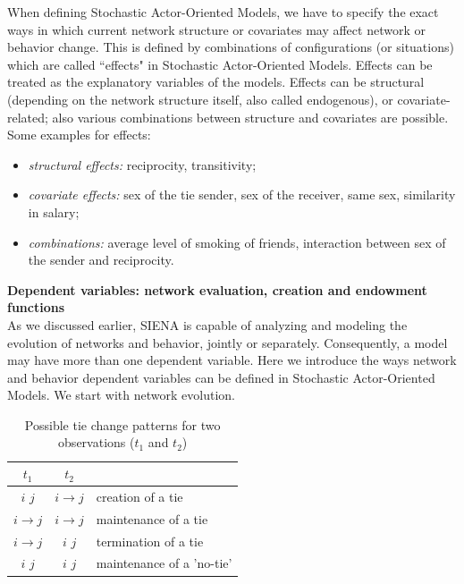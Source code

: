 \documentclass[a4paper,fleqn,11pt]{article}
\newcommand{\+}{\, + \,}
\newcommand{\SI}{{\sf SIENA }}
\newcommand{\saom}{{Stochastic Actor-Oriented Model}}
\begin{document}
When defining {\saom}s, we have to specify
the exact ways in which current network structure or covariates may affect
network or behavior change. This is defined
by combinations of configurations (or situations) which
are called ``effects" in {\saom}s.
Effects can be treated as the explanatory variables of the models.
Effects can be structural (depending on the network structure itself,
also called endogenous), or covariate-related; also various combinations
between structure and covariates are possible. Some examples for effects:
\begin{itemize}
	\item \emph{structural effects:} reciprocity, transitivity;
	\item \emph{covariate effects:} sex of the tie sender, sex of the receiver,
                same sex, similarity in salary;
	\item \emph{combinations:} average level of smoking of friends,
                interaction between sex of the sender and reciprocity.\\
\end{itemize}

\noindent
\textbf{Dependent variables: network evaluation, creation and endowment functions}\\

As we discussed earlier, \SI is capable of analyzing and modeling the
evolution of networks and behavior, jointly or separately.
Consequently, a model may have more than one dependent variable.
Here we introduce the ways network and behavior dependent variables
can be defined in {\saom}s. We start with network evolution.

\def\Fspace{\space\space\space\space}
\begin{table}[h]
	\centering
	\caption{Possible tie change patterns for two observations ($t_1$ and $t_2$)}
	\label{tab:TCpat}
	\vspace{\baselineskip}
	\begin{tabular}{c | c | l}
		$t_{1}$ 				& $t_{2}$ 				&														\\ \hline
		$i$ \Fspace $j$ & $i  \to 		 j$	& creation of a tie 				\\
		$i  \to			 j$	& $i  \to 		 j$	& maintenance of a tie 			\\
		$i  \to			 j$	& $i$ \Fspace $j$ & termination of a tie 			\\
		$i$ \Fspace $j$	& $i$ \Fspace $j$ & maintenance of a 'no-tie' \\
	\end{tabular}
\end{table}
\end{document}
